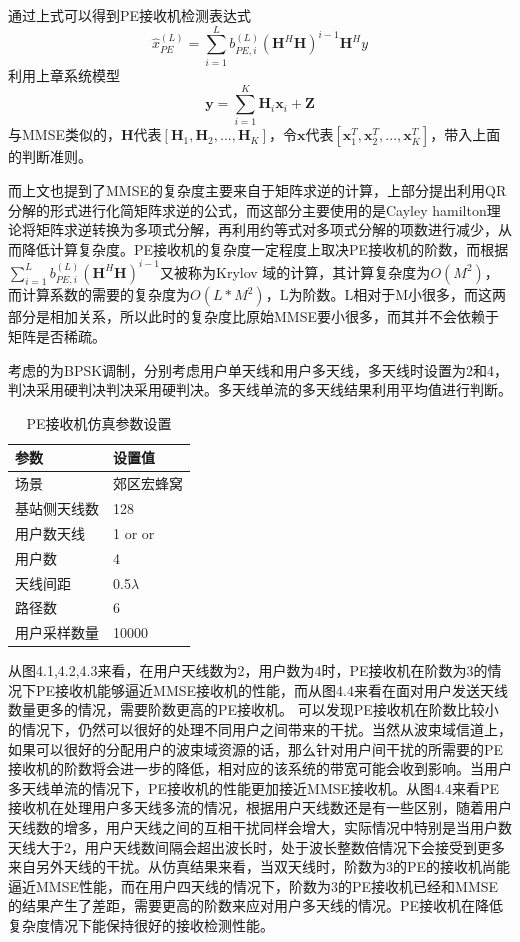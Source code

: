 \documentclass[bachelor,nocolorlinks, printoneside]{seuthesis} %
\begin{document}
\begin{Main}
通过上式可以得到PE接收机检测表达式
\begin{equation}\label{key}
\hat{x}_{PE}^{(L)} = \sum_{i=1}^{L}b_{PE,i}^{(L)}(\mathbf{H}^H\mathbf{H})^{i-1}  \mathbf{H}^H y
\end{equation}
利用上章系统模型
\begin{equation}\label{key}
	\mathbf{y} = \sum_{i=1}^{K} \mathbf{H}_i \mathbf{x}_i + \mathbf{Z}
\end{equation}
与MMSE类似的，$\mathbf{H}$代表$[\mathbf{H}_1,\mathbf{H}_2,...,\mathbf{H}_K]$，令$\mathbf{x}$代表$[\mathbf{x}_1^T,\mathbf{x}_2^T,...,\mathbf{x}_K^T]$，带入上面的判断准则。

而上文也提到了MMSE的复杂度主要来自于矩阵求逆的计算，上部分提出利用QR分解的形式进行化简矩阵求逆的公式，而这部分主要使用的是Cayley hamilton理论将矩阵求逆转换为多项式分解，再利用约等式对多项式分解的项数进行减少，从而降低计算复杂度。PE接收机的复杂度一定程度上取决PE接收机的阶数，而根据$\sum_{i=1}^{L} b_{PE,i}^{(L)}(\mathbf{H}^H\mathbf{H})^{i-1}$又被称为Krylov 域的计算，其计算复杂度为$O(M^2)$，而计算系数的需要的复杂度为$O(L*M^2)$，L为阶数。L相对于M小很多，而这两部分是相加关系，所以此时的复杂度比原始MMSE要小很多，而其并不会依赖于矩阵是否稀疏。

考虑的为BPSK调制，分别考虑用户单天线和用户多天线，多天线时设置为2和4，判决采用硬判决判决采用硬判决。多天线单流的多天线结果利用平均值进行判断。
\begin{table}[htbp]
	\centering
	\caption{\label{tab:test}PE接收机仿真参数设置}
	\begin{tabular}{ll}
		\toprule
		参数 &  设置值 \\
		\bottomrule
		场景 &  郊区宏蜂窝 \\
		\bottomrule
		基站侧天线数 & 128 \\
		\bottomrule
		用户数天线	& 1 \quad or\quad2 or\quad4\\
		\bottomrule
		用户数	& 4 \\
		\bottomrule
		天线间距 & 0.5$\lambda$ \\
		\bottomrule
		路径数 & 6 \\
		\bottomrule
		用户采样数量 & 10000 \\
		\bottomrule
	\end{tabular}
\end{table}


从图4.1,4.2,4.3来看，在用户天线数为2，用户数为4时，PE接收机在阶数为3的情况下PE接收机能够逼近MMSE接收机的性能，而从图4.4来看在面对用户发送天线数量更多的情况，需要阶数更高的PE接收机。
可以发现PE接收机在阶数比较小的情况下，仍然可以很好的处理不同用户之间带来的干扰。当然从波束域信道上，如果可以很好的分配用户的波束域资源的话，那么针对用户间干扰的所需要的PE接收机的阶数将会进一步的降低，相对应的该系统的带宽可能会收到影响。当用户多天线单流的情况下，PE接收机的性能更加接近MMSE接收机。从图4.4来看PE接收机在处理用户多天线多流的情况，根据用户天线数还是有一些区别，随着用户天线数的增多，用户天线之间的互相干扰同样会增大，实际情况中特别是当用户数天线大于2，用户天线数间隔会超出波长时，处于波长整数倍情况下会接受到更多来自另外天线的干扰。从仿真结果来看，当双天线时，阶数为3的PE的接收机尚能逼近MMSE性能，而在用户四天线的情况下，阶数为3的PE接收机已经和MMSE的结果产生了差距，需要更高的阶数来应对用户多天线的情况。PE接收机在降低复杂度情况下能保持很好的接收检测性能。


\end{Main}
\end{document}
